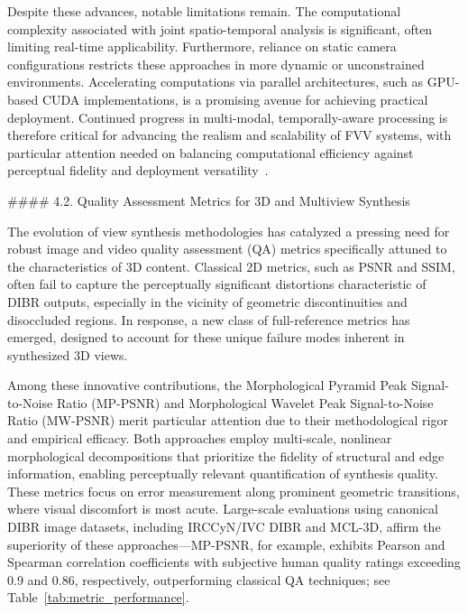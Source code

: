 \documentclass[11pt]{article}
\begin{document}
Despite these advances, notable limitations remain. The computational complexity associated with joint spatio-temporal analysis is significant, often limiting real-time applicability. Furthermore, reliance on static camera configurations restricts these approaches in more dynamic or unconstrained environments. Accelerating computations via parallel architectures, such as GPU-based CUDA implementations, is a promising avenue for achieving practical deployment. Continued progress in multi-modal, temporally-aware processing is therefore critical for advancing the realism and scalability of FVV systems, with particular attention needed on balancing computational efficiency against perceptual fidelity and deployment versatility~\cite{FVVRef98}.

#### 4.2. Quality Assessment Metrics for 3D and Multiview Synthesis

The evolution of view synthesis methodologies has catalyzed a pressing need for robust image and video quality assessment (QA) metrics specifically attuned to the characteristics of 3D content. Classical 2D metrics, such as PSNR and SSIM, often fail to capture the perceptually significant distortions characteristic of DIBR outputs, especially in the vicinity of geometric discontinuities and disoccluded regions. In response, a new class of full-reference metrics has emerged, designed to account for these unique failure modes inherent in synthesized 3D views.

Among these innovative contributions, the Morphological Pyramid Peak Signal-to-Noise Ratio (MP-PSNR) and Morphological Wavelet Peak Signal-to-Noise Ratio (MW-PSNR) merit particular attention due to their methodological rigor and empirical efficacy. Both approaches employ multi-scale, nonlinear morphological decompositions that prioritize the fidelity of structural and edge information, enabling perceptually relevant quantification of synthesis quality. These metrics focus on error measurement along prominent geometric transitions, where visual discomfort is most acute. Large-scale evaluations using canonical DIBR image datasets, including IRCCyN/IVC DIBR and MCL-3D, affirm the superiority of these approaches—MP-PSNR, for example, exhibits Pearson and Spearman correlation coefficients with subjective human quality ratings exceeding 0.9 and 0.86, respectively, outperforming classical QA techniques; see Table~\ref{tab:metric_performance}.
\end{document}
